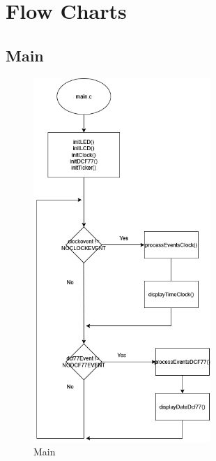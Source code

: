 \documentclass[a4paper,12pt]{article}
\begin{document}
\newpage


\section{Flow Charts}


\subsection{Main}

\begin{figure}[H]
    \centering
    \includegraphics[width=0.6\textwidth]{diagrams/2.Main.png}
    \caption{Main}
    \label{fig:Main}
\end{figure}

\end{document}
